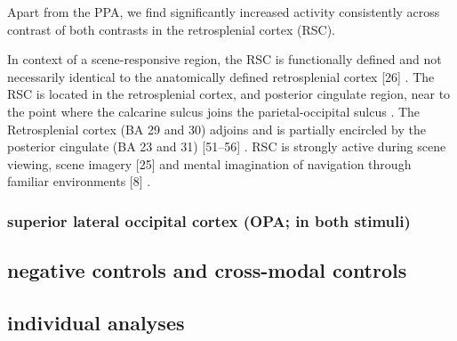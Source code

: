 \documentclass[english]{article}
\begin{document}
Apart from the PPA, we find significantly increased activity consistently across
contrast of both contrasts in the retrosplenial cortex (RSC).


In context of a scene-responsive region, the RSC is functionally defined and not
necessarily identical to the anatomically defined retrosplenial cortex [26]
\citep{epstein2008parahippocampal}.
The RSC is located in the retrosplenial cortex, and posterior cingulate region,
near to the point where the calcarine sulcus joins the parietal-occipital sulcus
\citep{epstein2008parahippocampal}.
The Retrosplenial cortex (BA 29 and 30) adjoins and is partially encircled by
the posterior cingulate (BA 23 and 31) [51–56]
\citep{epstein2008parahippocampal}.
RSC is strongly active during scene viewing, scene imagery [25] and mental
imagination of navigation through familiar environments [8]
\citep{epstein2008parahippocampal}.



\subsubsection{superior lateral occipital cortex (OPA; in both stimuli)}





\subsection{negative controls and cross-modal controls}



\subsection{individual analyses}
\end{document}
